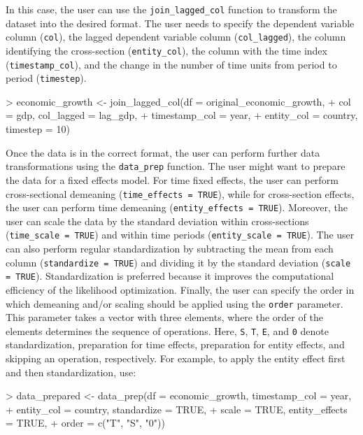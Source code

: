 \documentclass[a4paper]{article}
\begin{document}
In this case, the user can use the \verb+join_lagged_col+ function to transform the dataset into the desired format.
The user needs to specify the dependent variable column (\verb+col+), the lagged dependent variable column (\verb+col_lagged+), the column identifying the cross-section (\verb+entity_col+), the column with the time index (\verb+timestamp_col+), and the change in the number of time units from period to period (\verb+timestep+).

\begin{Schunk}
\begin{Sinput}
> economic_growth <- join_lagged_col(df = original_economic_growth,
+                         col = gdp, col_lagged = lag_gdp,
+                         timestamp_col = year,
+                         entity_col = country, timestep = 10)
\end{Sinput}
\end{Schunk}

Once the data is in the correct format, the user can perform further data transformations using the \verb+data_prep+ function.
The user might want to prepare the data for a fixed effects model.
For time fixed effects, the user can perform cross-sectional demeaning (\verb+time_effects = TRUE+), while for cross-section effects, the user can perform time demeaning (\verb+entity_effects = TRUE+).
Moreover, the user can scale the data by the standard deviation within cross-sections (\verb+time_scale = TRUE+) and within time periods (\verb+entity_scale = TRUE+).
The user can also perform regular standardization by subtracting the mean from each column (\verb+standardize = TRUE+) and dividing it by the standard deviation (\verb+scale = TRUE+).
Standardization is preferred because it improves the computational efficiency of the likelihood optimization.
Finally, the user can specify the order in which demeaning and/or scaling should be applied using the \verb+order+ parameter.
This parameter takes a vector with three elements, where the order of the elements determines the sequence of operations.
Here, \texttt{S}, \texttt{T}, \texttt{E}, and \texttt{0} denote standardization, preparation for time effects, preparation for entity effects, and skipping an operation, respectively.
For example, to apply the entity effect first and then standardization, use:
\begin{Schunk}
\begin{Sinput}
> data_prepared <- data_prep(df = economic_growth, timestamp_col = year,
+                            entity_col = country, standardize = TRUE,
+                            scale = TRUE, entity_effects = TRUE,
+                            order = c("T", "S", "0"))
\end{Sinput}
\end{Schunk}
\end{document}
